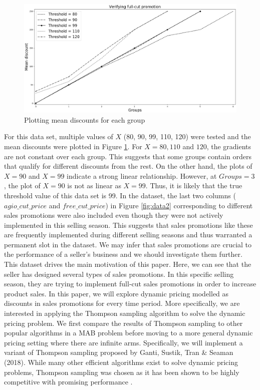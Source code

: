 \documentclass[a4paper]{article}
\begin{document}
\begin{figure}[h]
	\centering
	\includegraphics[width=1.05\textwidth]{threshold.png}
	\caption{\label{fig:threshold}Plotting mean discounts for each group}
\end{figure}
\newline
\newline
For this data set, multiple values of $X$ (80, 90, 99, 110, 120) were tested and the mean discounts were plotted in Figure \ref{fig:threshold}. For $X = 80, 110$ and $120$, the gradients are not constant over each group. This suggests that some groups contain orders that qualify for different discounts from the rest. On the other hand, the plots of $X = 90$ and $X = 99$ indicate a strong linear relationship. However, at $Groups = 3$, the plot of $X = 90$ is not as linear as $X=99$. Thus, it is likely that the true threshold value of this data set is 99.
\newline
\newline
In the dataset, the last two columns ($agio\_cut\_price$ and $free\_cut\_price$) in Figure \ref{fig:data2} corresponding to different sales promotions were also included even though they were not actively implemented in this selling season. This suggests that sales promotions like these are frequently implemented during different selling seasons and thus warranted a permanent slot in the dataset. We may infer that sales promotions are crucial to the performance of a seller's business and we should investigate them further.
\newline
\newline
\newline
This dataset drives the main motivation of this paper. Here, we can see that the seller has designed several types of sales promotions. In this specific selling season, they are trying to implement full-cut sales promotions in order to increase product sales. In this paper, we will explore dynamic pricing modelled as discounts in sales promotions for every time period. More specifically, we are interested in applying the Thompson sampling algorithm to solve the dynamic pricing problem. We first compare the results of Thompson sampling to other popular algorithms in a MAB problem before moving to a more general dynamic pricing setting where there are infinite arms. Specifically, we will implement a variant of Thompson sampling proposed by Ganti, Sustik, Tran \& Seaman (2018). While many other efficient algorithms exist to solve dynamic pricing problems, Thompson sampling was chosen as it has been shown to be highly competitive with promising performance \cite{thomp}. 
\end{document}
